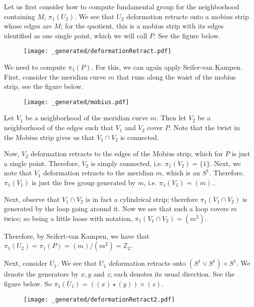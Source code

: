 Let us first consider how to compute fundamental group for the neighborhood containing \(M\), \(\pi_1(U_2)\). We
see that \(U_2\) deformation retracts onto a mobius strip whose edges are \(M\); for the quotient, this is a
mobius strip with its edges identified as one single point, which we will call \(P\). See the figure below.

\begin{figure}[h]
\centering
\texttt{[image: \_generated/deformationRetract.pdf]}
\end{figure}

We need to compute \(\pi_1(P)\). For this, we can again apply Seifer-van Kampen. First, consider the meridian 
curve \(m\) that runs along the waist of the 
mobius strip, see the figure below. 

\begin{figure}[h]
\centering
\texttt{[image: \_generated/mobius.pdf]}
\end{figure}
Let \(V_1\) be a neighborhood of
the meridian curve \(m\). Then let \(V_2\) be a neighborhood of 
the edges such that \(V_1\) and \(V_2\) cover \(P\). Note that the twist in the Mobius strip gives us that
\(V_1 \cap V_2\) is connected.

Now, \(V_2\) deformation retracts to the edges of the Mobius strip, which for \(P\) is just a single point.
Therefore, \(V_2\) is simply connected, i.e. \(\pi_1(V_2) = \{1\}\). Next, we note that \(V_1\) deformation
retracts to the meridian \(m\), which is an \(S^1\). Therefore, \(\pi_1(V_1)\) is just the free group 
generated by \(m\), i.e. \(\pi_1(V_1) = (m)\)..

Next, observe that \(V_1 \cap V_2\) is in fact a cylindrical strip; therefore \(\pi_1(V_1 \cap V_2)\) is generated
by the loop going around it. Now we see that such a loop covers \(m\) twice; so being a little loose with
notation, \(\pi_1(V_1 \cap V_2) = (m^2)\).

Therefore, by Seifert-van Kampen, we have that \(\pi_1(U_2) = \pi_1(P) = (m) / (m^2) = \mathbb Z_2\).

Next, consider \(U_1\). We see that \(U_1\) deformation retracts onto \((S^1 \vee S^1) \times S^1\). We
denote the generators by \(x, y\) and \(z\); each denotes its usual direction. See the figure below.
So \(\pi_1(U_1) = ((x) \star (y))\times (z)\).

\begin{figure}[h]
\centering
\texttt{[image: \_generated/deformationRetract2.pdf]}
\end{figure} 

